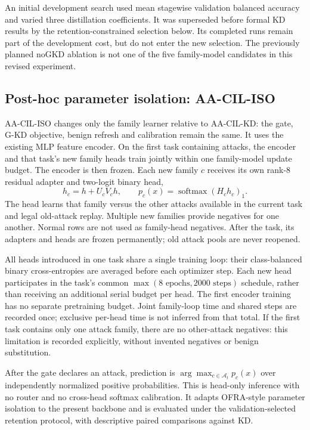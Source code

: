 \documentclass[10pt,twocolumn]{article}
\begin{document}
An initial development search used mean stagewise validation balanced accuracy and varied three distillation coefficients. It was superseded before formal KD results by the retention-constrained selection below. Its completed runs remain part of the development cost, but do not enter the new selection. The previously planned noGKD ablation is not one of the five family-model candidates in this revised experiment.

\subsection{Post-hoc parameter isolation: AA-CIL-ISO}
AA-CIL-ISO changes only the family learner relative to AA-CIL-KD: the gate, G-KD objective, benign refresh and calibration remain the same. It uses the existing MLP feature encoder. On the first task containing attacks, the encoder and that task's new family heads train jointly within one family-model update budget. The encoder is then frozen. Each new family $c$ receives its own rank-8 residual adapter and two-logit binary head,
\begin{equation}
 h_c=h+U_cV_ch,\qquad p_c(x)=\operatorname{softmax}(H_ch_c)_1.
\end{equation}
The head learns that family versus the other attacks available in the current task and legal old-attack replay. Multiple new families provide negatives for one another. Normal rows are not used as family-head negatives. After the task, its adapters and heads are frozen permanently; old attack pools are never reopened.

All heads introduced in one task share a single training loop: their class-balanced binary cross-entropies are averaged before each optimizer step. Each new head participates in the task's common $\max(8\text{ epochs},2000\text{ steps})$ schedule, rather than receiving an additional serial budget per head. The first encoder training has no separate pretraining budget. Joint family-loop time and shared steps are recorded once; exclusive per-head time is not inferred from that total. If the first task contains only one attack family, there are no other-attack negatives: this limitation is recorded explicitly, without invented negatives or benign substitution.

After the gate declares an attack, prediction is $\arg\max_{c\in\mathcal A_t}p_c(x)$ over independently normalized positive probabilities. This is head-only inference with no router and no cross-head softmax calibration. It adapts OFRA-style parameter isolation to the present backbone and is evaluated under the validation-selected retention protocol, with descriptive paired comparisons against KD.
\end{document}
